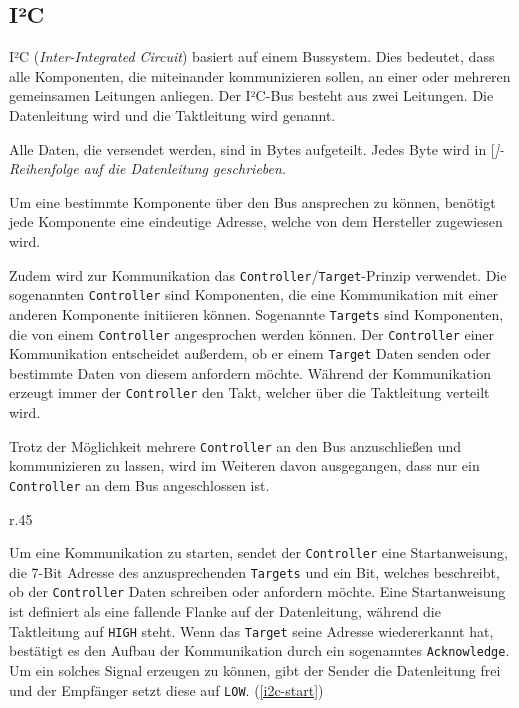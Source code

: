 \subsection{I²C}

I²C (\textit{Inter-Integrated Circuit}) basiert auf einem Bussystem.
Dies bedeutet, dass alle Komponenten, die miteinander kommunizieren sollen, an einer oder mehreren gemeinsamen Leitungen anliegen.
Der I²C-Bus besteht aus zwei Leitungen.
Die Datenleitung wird  und die Taktleitung wird  genannt.
\cite[6]{I2C-spec_userManual}

Alle Daten, die versendet werden, sind in Bytes aufgeteilt.
Jedes Byte wird in [\itshape]-Reihenfolge auf die Datenleitung geschrieben.

Um eine bestimmte Komponente über den Bus ansprechen zu können, benötigt jede Komponente eine eindeutige Adresse, welche von dem Hersteller zugewiesen wird.

Zudem wird zur Kommunikation das \texttt{Controller}/\texttt{Target}-Prinzip verwendet.
Die sogenannten \texttt{Controller} sind Komponenten, die eine Kommunikation mit einer anderen Komponente initiieren können.
Sogenannte \texttt{Targets} sind Komponenten, die von einem \texttt{Controller} angesprochen werden können.
Der \texttt{Controller} einer Kommunikation entscheidet außerdem, ob er einem \texttt{Target} Daten senden oder bestimmte Daten von diesem anfordern möchte.
Während der Kommunikation erzeugt immer der \texttt{Controller} den Takt, welcher über die Taktleitung verteilt wird.
\cite[6]{I2C-spec_userManual}

Trotz der Möglichkeit mehrere \texttt{Controller} an den Bus anzuschließen und kommunizieren zu lassen, wird im Weiteren davon ausgegangen, dass nur ein \texttt{Controller} an dem Bus angeschlossen ist.

\begin{wrapfigure}{r}{.45\textwidth}
	\centering
	\scalebox{1.25}{}
	\caption{Kommunikationsaufbau}
	\label{i2c-start}
\end{wrapfigure}
Um eine Kommunikation zu starten, sendet der \texttt{Controller} eine Startanweisung, die 7-Bit Adresse des anzusprechenden \texttt{Targets} und ein Bit, welches beschreibt, ob der \texttt{Controller} Daten schreiben oder anfordern möchte.
Eine Startanweisung ist definiert als eine fallende Flanke auf der Datenleitung, während die Taktleitung auf \texttt{HIGH} steht.
Wenn das \texttt{Target} seine Adresse wiedererkannt hat, bestätigt es den Aufbau der Kommunikation durch ein sogenanntes \texttt{Acknowledge}.
Um ein solches Signal erzeugen zu können, gibt der Sender die Datenleitung frei und der Empfänger setzt diese auf \texttt{LOW}.
(\ref{i2c-start})
\cite[9\psq\ \& 12\psq]{I2C-spec_userManual}

